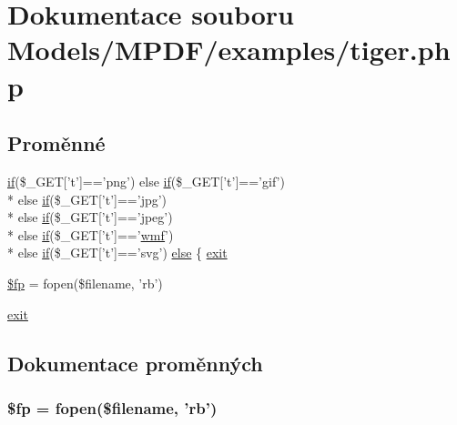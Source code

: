 \hypertarget{tiger_8php}{\section{Dokumentace souboru Models/\-M\-P\-D\-F/examples/tiger.php}
\label{tiger_8php}
}
\subsection*{Proměnné}
\begin{DoxyCompactItemize}
\item 
\hyperlink{pdf__parser_8php_af8105e84b42a9ceda5357caeb6c4760b}{if}(\$\-\_\-\-G\-E\-T\mbox{[}'t'\mbox{]}=='png') else \hyperlink{pdf__parser_8php_af8105e84b42a9ceda5357caeb6c4760b}{if}(\$\-\_\-\-G\-E\-T\mbox{[}'t'\mbox{]}=='gif') \\*
else \hyperlink{pdf__parser_8php_af8105e84b42a9ceda5357caeb6c4760b}{if}(\$\-\_\-\-G\-E\-T\mbox{[}'t'\mbox{]}=='jpg') \\*
else \hyperlink{pdf__parser_8php_af8105e84b42a9ceda5357caeb6c4760b}{if}(\$\-\_\-\-G\-E\-T\mbox{[}'t'\mbox{]}=='jpeg') \\*
else \hyperlink{pdf__parser_8php_af8105e84b42a9ceda5357caeb6c4760b}{if}(\$\-\_\-\-G\-E\-T\mbox{[}'t'\mbox{]}=='\hyperlink{classwmf}{wmf}') \\*
else \hyperlink{pdf__parser_8php_af8105e84b42a9ceda5357caeb6c4760b}{if}(\$\-\_\-\-G\-E\-T\mbox{[}'t'\mbox{]}=='svg') \hyperlink{tiger_8php_a07a7461d4da92999bb050ce9987b65db}{else} \{ \hyperlink{font__names_8php_a6733eb5f605d09eaede9845835d71c4e}{exit}
\item 
\hyperlink{tiger_8php_a1d2c1369c63343a169bc25d1a0475482}{\$fp} = fopen(\$filename, 'rb')
\item 
\hyperlink{tiger_8php_a6733eb5f605d09eaede9845835d71c4e}{exit}
\end{DoxyCompactItemize}


\subsection{Dokumentace proměnných}
\hypertarget{tiger_8php_a1d2c1369c63343a169bc25d1a0475482}{
\subsubsection[{\$fp}]{\setlength{\rightskip}{0pt plus 5cm}\$fp = fopen(\$filename, 'rb')}}\label{tiger_8php_a1d2c1369c63343a169bc25d1a0475482}


